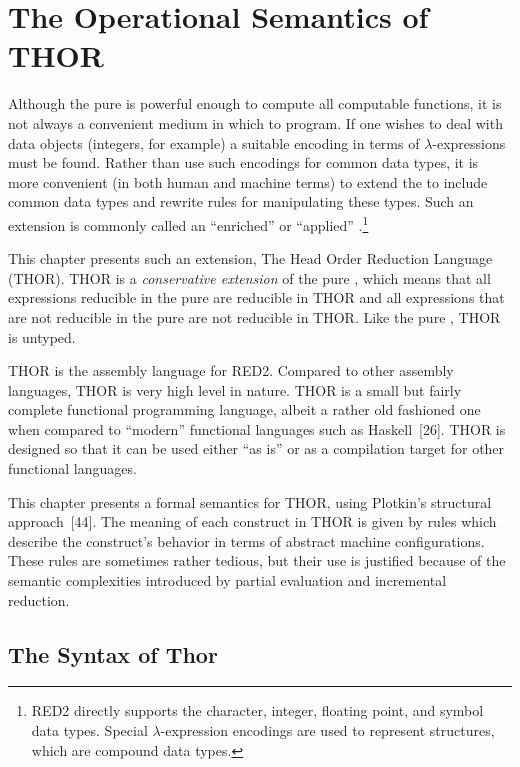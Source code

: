 \chapter{The Operational Semantics of THOR}

Although the pure \lambdacalculus{} is powerful enough to compute all
computable functions, it is not always a convenient medium in which to program.
If one wishes to deal with data objects (integers, for example) a suitable
encoding in terms of \(\lambda\)-expressions must be found. Rather than use such
encodings for common data types, it is more convenient (in both human and
machine terms) to extend the \lambdacalculus{} to include common data types and
rewrite rules for manipulating these types. Such an extension is commonly called
an ``enriched'' or ``applied'' \lambdacalculus.\footnote{RED2 directly supports
the character, integer, floating point, and symbol data types. Special
\(\lambda\)-expression encodings are used to represent structures, which are
compound data types.}

This chapter presents such an extension, The Head Order Reduction Language
(THOR). THOR is a \emph{conservative extension} of the pure \lambdacalculus, which
means that all expressions reducible in the pure \lambdacalculus{} are
reducible in THOR and all expressions that are not reducible in the pure
\lambdacalculus{} are not reducible in THOR. Like the pure \lambdacalculus,
THOR is untyped.

THOR is the assembly language for RED2. Compared to other assembly languages,
THOR is very high level in nature. THOR is a small but fairly complete
functional programming language, albeit a rather old fashioned one when compared
to ``modern'' functional languages such as Haskell~[26]. THOR is designed so
that it can be used either ``as is'' or as a compilation target for other
functional languages.

This chapter presents a formal semantics for THOR, using Plotkin's structural
approach~[44]. The meaning of each construct in THOR is given by rules which
describe the construct's behavior in terms of abstract machine configurations.
These rules are sometimes rather tedious, but their use is justified because of
the semantic complexities introduced by partial evaluation and incremental
reduction.

\section{The Syntax of Thor}

